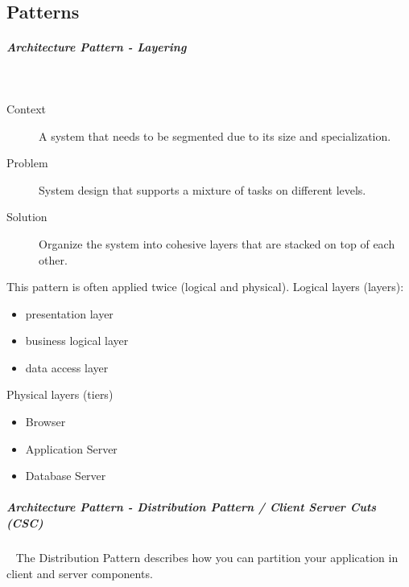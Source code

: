 \documentclass[11pt,twoside,landscape]{article}
\begin{document}
\begin{multicols}{3}
\section{Patterns}
\label{sec:orgcd88a9b}
\subparagraph{Architecture Pattern - Layering} \
\label{sec:orga294151}
\begin{description}
\item[{Context}] A system that needs to be segmented due to its size and specialization.
\item[{Problem}] System design that supports a mixture of tasks on different levels.
\item[{Solution}] Organize the system into cohesive layers that are stacked on top of each other.
\end{description}


This pattern is often applied twice (logical and physical).
Logical layers (layers):
\begin{itemize}
\item presentation layer
\item business logical layer
\item data access layer
\end{itemize}

Physical layers (tiers)
\begin{itemize}
\item Browser
\item Application Server
\item Database Server
\end{itemize}
\subparagraph{Architecture Pattern - Distribution Pattern / Client Server Cuts (CSC)} \
\label{sec:org0299e16}
The Distribution Pattern describes how you can partition your application in client and server components.


\end{multicols}
\end{document}

